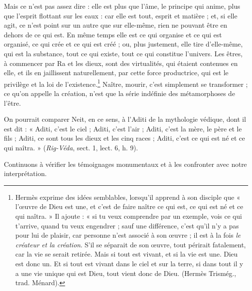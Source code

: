 \documentclass[a4paper, 11pt, oneside]{article}
\begin{document}
Mais ce n'est pas assez dire : elle est plus que l'âme, le principe qui anime, plus que l'esprit flottant sur les eaux : car elle est tout, esprit et matière ; et, si elle agit, ce n'est point sur un autre que sur elle-même, rien ne pouvant être en dehors de ce qui est. En même temps elle est ce qui organise et ce qui est organisé, ce qui crée et ce qui est créé ; ou, plus justement, elle tire d'elle-même, qui est la substance, tout ce qui existe, tout ce qui constitue l'univers. Les êtres, à commencer par Ra et les dieux, sont des virtualités, qui étaient contenues en elle, et ils en jaillissent naturellement, par cette force productrice, qui est le privilège et la loi de l'existence.\footnote{Hermès exprime des idées semblables, lorsqu'il apprend à son disciple que « l'œuvre de Dieu est une, et c'est de faire naître ce qui est, ce qui est né et ce qui naîtra. » Il ajoute : « si tu veux comprendre par un exemple, vois ce qui t'arrive, quand tu veux engendrer ; sauf une différence, c'est qu'il n'y a pas pour lui de plaisir, car personne n'est associé à son œuvre ; il est à la fois \emph{le créateur et la création}. S'il se séparait de son œuvre, tout périrait fatalement, car la vie se serait retirée. Mais si tout est vivant, et si la vie est une. Dieu est donc un. Et si tout est vivant dans le ciel et sur la terre, si dans tout il y a une vie unique qui est Dieu, tout vient donc de Dieu. (Hermès Trismég., trad. Ménard).} Naître, mourir, c'est simplement se transformer ; ce qu'on appelle la création, n'est que la série indéfinie des métamorphoses de l'être.

On pourrait comparer Neit, en ce sens, à l'Aditi de la mythologie védique, dont il est dit : « Aditi, c'est le ciel ; Aditi, c'est l'air ; Aditi, c'est la mère, le père et le fils ; Aditi, ce sont tous les dieux et les cinq races ; Aditi, c'est ce qui est né et ce qui naîtra. » (\emph{Rig-Véda}, sect. 1, lect. 6, h. 9).

Continuons à vérifier les témoignages monumentaux et à les confronter avec notre interprétation.
\end{document}
